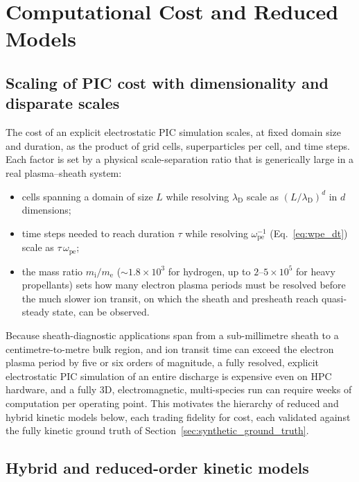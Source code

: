 \section{Computational Cost and Reduced Models}

\subsection{Scaling of PIC cost with dimensionality and disparate scales}

The cost of an explicit electrostatic PIC simulation scales, at fixed domain size and duration, as the product of grid cells, superparticles per cell, and time steps. Each factor is set by a physical scale-separation ratio that is generically large in a real plasma--sheath system:
\begin{itemize}
\item cells spanning a domain of size $L$ while resolving $\lambda_{\mathrm{D}}$ scale as $(L/\lambda_{\mathrm{D}})^{d}$ in $d$ dimensions;
\item time steps needed to reach duration $\tau$ while resolving $\omega_{\mathrm{pe}}^{-1}$ (Eq.~\eqref{eq:wpe_dt}) scale as $\tau\,\omega_{\mathrm{pe}}$;
\item the mass ratio $m_{\mathrm{i}}/m_{\mathrm{e}}$ ($\sim 1.8\times10^{3}$ for hydrogen, up to $2\text{--}5\times10^{5}$ for heavy propellants) sets how many electron plasma periods must be resolved before the much slower ion transit, on which the sheath and presheath reach quasi-steady state, can be observed.
\end{itemize}
Because sheath-diagnostic applications span from a sub-millimetre sheath to a centimetre-to-metre bulk region, and ion transit time can exceed the electron plasma period by five or six orders of magnitude, a fully resolved, explicit electrostatic PIC simulation of an entire discharge is expensive even on HPC hardware, and a fully 3D, electromagnetic, multi-species run can require weeks of computation per operating point. This motivates the hierarchy of reduced and hybrid kinetic models below, each trading fidelity for cost, each validated against the fully kinetic ground truth of Section~\ref{sec:synthetic_ground_truth}.

\subsection{Hybrid and reduced-order kinetic models}

